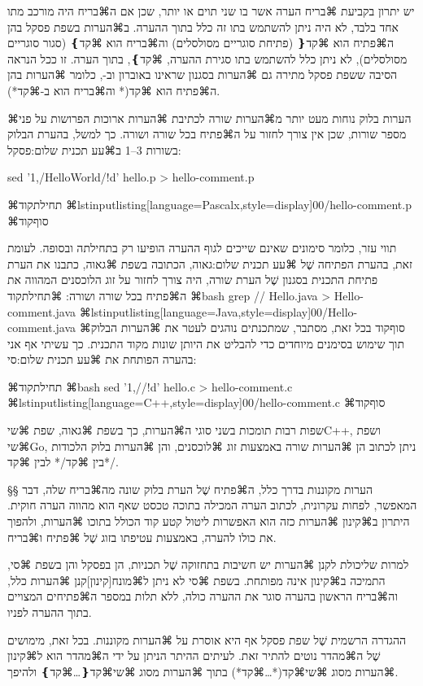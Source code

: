 יש יתרון בקביעת ⌘בריח הערה אשר בו שני תוים או יותר, שכן אם ה⌘בריח היה מורכב
מתו אחד בלבד, לא היה ניתן להשתמש בתו זה כלל בתוך ההערה. ב⌘הערות בשפת פסקל בהן
ה⌘פתיח הוא ⌘קד{❴} (פתיחת סוגריים מסולסלים) וה⌘בריח הוא ⌘קד{❵} (סגור סוגריים
מסולסלים), לא ניתן כלל להשתמש בתו סגירת ההערה, ⌘קד{❵}, בתוך הערה. זו ככל
הנראה הסיבה ששפת פסקל מתירה גם ⌘הערות בסגנון שראינו באוברון וב-,
כלומר ⌘הערות בהן ה⌘פתיח הוא ⌘קד{(*} וה⌘בריח הוא ב-⌘קד{*)}.

⌘הערות בלוק נוחות מעט יותר מ⌘הערות שורה לכתיבת ⌘הערות ארוכות הפרושות על פני
מספר שורות, שכן אין צורך לחזור על ה⌘פתיח בכל שורה ושורה. כך למשל, בהערת הבלוק
בשורות 3--1 ב⌘עע תכנית שלום:פסקל{}:

\bash
sed '1,/HelloWorld/!d' hello.p > hello-comment.p
\END

⌘תחילת{קוד}
⌘lstinputlisting[language=Pascalx,style=display]{00/hello-comment.p}
⌘סוף{קוד}

תווי עזר, כלומר סימונים שאינם שייכים לגוף ההערה הופיעו רק בתחילתה ובסופה.
לעומת זאת, בהערת הפתיחה שֶׁל ⌘עע תכנית שלום:גאוה, הכתובה בשפת ⌘גאוה, כתבנו את
הערת פתיחת התכנית בסגנון שֶׁל הערת שורה, היה צורך לחזור על זוג הלוכסנים המהווה
את ה⌘פתיח בכל שורה ושורה:
⌘תחילת{קוד}
⌘bash
grep // Hello.java > Hello-comment.java
\END
⌘lstinputlisting[language=Java,style=display]{00/Hello-comment.java}
⌘סוף{קוד}
בכל זאת, מסתבר, שמתכנתים נוהגים לעטר את ⌘הערות הבלוק תוך שימוש בסימנים מיוחדים
כדי להבליט את היותן שונות מקוד התכנית. כך עשיתי אף אני בהערה הפותחת את ⌘עע
תכנית שלום:סי{}:

⌘תחילת{קוד}
⌘bash
sed '1,/\*\//!d' hello.c > hello-comment.c
\END
⌘lstinputlisting[language=C++,style=display]{00/hello-comment.c}
⌘סוף{קוד}

שפות רבות תומכות בשני סוגי ה⌘הערות, כך בשפת ⌘גאוה, שפת ⌘שי{C++}, ושפת
⌘שי{Go}, ניתן לכתוב הן ⌘הערות שורה באמצעות זוג ⌘לוכסנים, והן ⌘הערות בלוק
הלכודות בין ⌘קד{/*} לבין ⌘קד{*/}.

§§ הערות מקוננות
בדרך כלל, ה⌘פתיח שֶׁל הערת בלוק שונה מה⌘בריח שלה, דבר המאפשר, לפחות עקרונית,
לכתוב הערה המכילה בתוכה טכסט שאף הוא מהווה הערה חוקית. היתרון ב⌘קינון ⌘הערות
כזה הוא האפשרות ליטול קטע קוד הכולל בתוכו ⌘הערות, ולהפוך את כולו להערה,
באמצעות עטיפתו בזוג שֶׁל ⌘פתיח ו⌘בריח.

למרות שליכולת לקנן ⌘הערות יש חשיבות בתחזוקה שֶׁל תכניות, הן בפסקל והן בשפת ⌘סי,
התמיכה ב⌘קינון אינה מפותחת. בשפת ⌘סי לא ניתן ל⌘מונח[קינון]{קנן} ⌘הערות כלל,
וה⌘בריח הראשון בהערה סוגר את ההערה כולה, ללא תלות במספר ה⌘פתיחים המצויים בתוך
ההערה לפניו.

ההגדרה הרשמית שֶׁל שפת פסקל אף היא אוסרת על ⌘הערות מקוננות. בכל זאת, מימושים שֶׁל
ה⌘מהדר נוטים להתיר זאת. לעיתים ההיתר הניתן על ידי ה⌘מהדר הוא ל⌘קינון ⌘הערות
מסוג ⌘שי{\mbox{⌘קד{(*}…⌘קד{*)}}} בתוך ⌘הערות מסוג ⌘שי{\mbox{⌘קד{❴}…⌘קד{❵}}}
ולהיפך.

